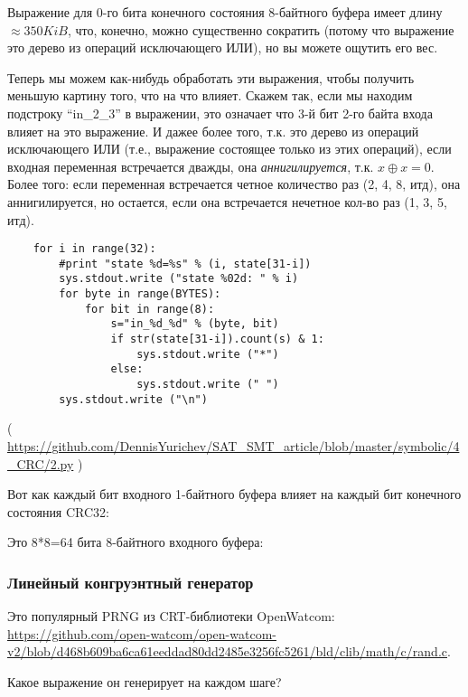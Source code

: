 Выражение для 0-го бита конечного состояния 8-байтного буфера имеет длину
$\approx 350KiB$, что, конечно, можно существенно сократить (потому что выражение это дерево из операций исключающего ИЛИ),
но вы можете ощутить его вес.

Теперь мы можем как-нибудь обработать эти выражения, чтобы получить меньшую картину того, что на что влияет.
Скажем так, если мы находим подстроку ``in\_2\_3'' в выражении, это означает что 3-й бит 2-го байта входа влияет на 
это выражение.
И дажее более того, т.к. это дерево из операций исключающего ИЛИ (т.е., выражение состоящее только из этих операций),
если входная переменная встречается дважды, она \textit{аннигилируется}, т.к. $x \oplus x=0$.
Более того: если переменная встречается четное количество раз (2, 4, 8, итд), она аннигилируется,
но остается, если она встречается нечетное кол-во раз (1, 3, 5, итд).

\begin{lstlisting}
    for i in range(32):
        #print "state %d=%s" % (i, state[31-i])
        sys.stdout.write ("state %02d: " % i)
        for byte in range(BYTES):
            for bit in range(8):
                s="in_%d_%d" % (byte, bit)
                if str(state[31-i]).count(s) & 1:
                    sys.stdout.write ("*")
                else:
                    sys.stdout.write (" ")
        sys.stdout.write ("\n")
\end{lstlisting}

( \url{https://github.com/DennisYurichev/SAT_SMT_article/blob/master/symbolic/4_CRC/2.py} )

Вот как каждый бит входного 1-байтного буфера влияет на каждый бит конечного состояния CRC32:



Это 8*8=64 бита 8-байтного входного буфера:



\subsubsection{Линейный конгруэнтный генератор}

Это популярный \ac{PRNG} из \ac{CRT}-библиотеки OpenWatcom: \url{https://github.com/open-watcom/open-watcom-v2/blob/d468b609ba6ca61eeddad80dd2485e3256fc5261/bld/clib/math/c/rand.c}.

Какое выражение он генерирует на каждом шаге?



